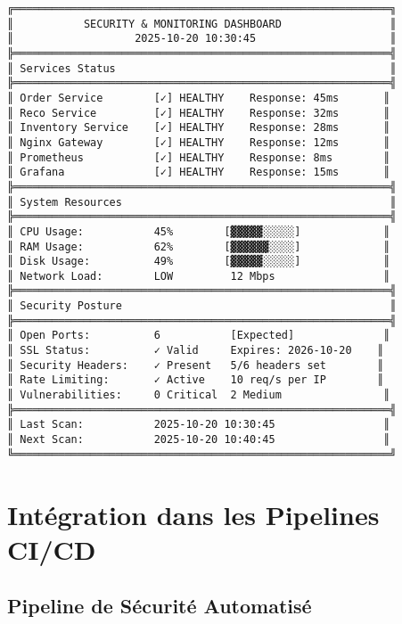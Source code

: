 \documentclass[11pt,a4paper]{report}
\begin{document}
\begin{lstlisting}[basicstyle=\ttfamily\tiny, caption=Exemple de Dashboard de Monitoring]
╔═══════════════════════════════════════════════════════════╗
║           SECURITY & MONITORING DASHBOARD                 ║
║                   2025-10-20 10:30:45                     ║
╠═══════════════════════════════════════════════════════════╣
║ Services Status                                           ║
╠═══════════════════════════════════════════════════════════╣
║ Order Service        [✓] HEALTHY    Response: 45ms       ║
║ Reco Service         [✓] HEALTHY    Response: 32ms       ║
║ Inventory Service    [✓] HEALTHY    Response: 28ms       ║
║ Nginx Gateway        [✓] HEALTHY    Response: 12ms       ║
║ Prometheus           [✓] HEALTHY    Response: 8ms        ║
║ Grafana              [✓] HEALTHY    Response: 15ms       ║
╠═══════════════════════════════════════════════════════════╣
║ System Resources                                          ║
╠═══════════════════════════════════════════════════════════╣
║ CPU Usage:           45%        [▓▓▓▓▓░░░░░]             ║
║ RAM Usage:           62%        [▓▓▓▓▓▓░░░░]             ║
║ Disk Usage:          49%        [▓▓▓▓▓░░░░░]             ║
║ Network Load:        LOW         12 Mbps                 ║
╠═══════════════════════════════════════════════════════════╣
║ Security Posture                                          ║
╠═══════════════════════════════════════════════════════════╣
║ Open Ports:          6           [Expected]              ║
║ SSL Status:          ✓ Valid     Expires: 2026-10-20    ║
║ Security Headers:    ✓ Present   5/6 headers set        ║
║ Rate Limiting:       ✓ Active    10 req/s per IP        ║
║ Vulnerabilities:     0 Critical  2 Medium                ║
╠═══════════════════════════════════════════════════════════╣
║ Last Scan:           2025-10-20 10:30:45                 ║
║ Next Scan:           2025-10-20 10:40:45                 ║
╚═══════════════════════════════════════════════════════════╝
\end{lstlisting}


\chapter{Intégration dans les Pipelines CI/CD}

\section{Pipeline de Sécurité Automatisé}
\end{document}
